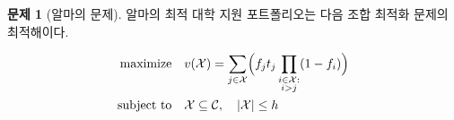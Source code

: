 \documentclass[11pt]{article} %
\newif\ifen
\theoremstyle{definition}
\newtheorem{problem}{Problem}
\theoremstyle{definition}
\newtheorem{problem}{문제}
\begin{document}
\begin{problem}[\ifen Alma’s problem\else 알마의 문제\fi]
\ifen Alma's optimal college application portfolio is given by the solution to the following combinatorial optimization problem:
\else
알마의 최적 대학 지원 포트폴리오는 다음 조합 최적화 문제의 최적해이다.
\fi
\begin{align}
\begin{split}
\text{maximize}\quad &  v(\mathcal{X}) = \sum_{j\in
\mathcal{X}} \Bigl( f_j t_j \prod_{\substack{i \in \mathcal{X}: \\ i > j}} (1 - f_{i}) \Bigr)\\
\text{subject to}\quad & \mathcal{X}\subseteq\mathcal{C}, \quad|\mathcal{X}| \leq h 
\end{split}
\end{align}
\end{problem}
\end{document}
